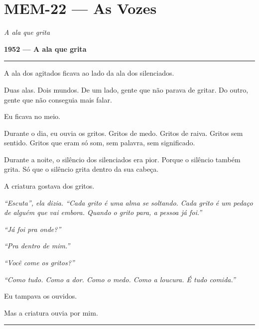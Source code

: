 \section*{\textbf{MEM-22} --- As Vozes}

\noindent \textit{A ala que grita}

\noindent \textbf{1952 --- A ala que grita}

\vspace{0.5em}\noindent\rule{\textwidth}{0.5pt}\vspace{0.5em}

\noindent A ala dos agitados ficava ao lado da ala dos silenciados.

\noindent Duas alas. Dois mundos. De um lado, gente que não parava de gritar. Do outro, gente que não conseguia mais falar.

\noindent Eu ficava no meio.

\noindent Durante o dia, eu ouvia os gritos. Gritos de medo. Gritos de raiva. Gritos sem sentido. Gritos que eram só som, sem palavra, sem significado.

\noindent Durante a noite, o silêncio dos silenciados era pior. Porque o silêncio também grita. Só que o silêncio grita dentro da sua cabeça.

\noindent A criatura gostava dos gritos.

\noindent \textit{\textquotedblleft{}Escuta\textquotedblright{}\textit{, ela dizia. }\textquotedblleft{}Cada grito é uma alma se soltando. Cada grito é um pedaço de alguém que vai embora. Quando o grito para, a pessoa já foi.\textquotedblright{}}

\noindent \textit{\textquotedblleft{}Já foi pra onde?\textquotedblright{}}

\noindent \textit{\textquotedblleft{}Pra dentro de mim.\textquotedblright{}}

\noindent \textit{ \textquotedblleft{}Você come os gritos?\textquotedblright{}}

\noindent \textit{\textquotedblleft{}Como tudo. Como a dor. Como o medo. Como a loucura. É tudo comida.\textquotedblright{}}

\noindent Eu tampava os ouvidos.

\noindent Mas a criatura ouvia por mim.

\vspace{0.5em}\noindent\rule{\textwidth}{0.5pt}\vspace{0.5em}

